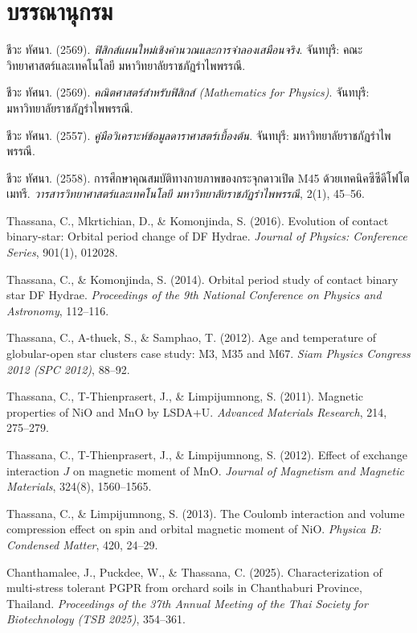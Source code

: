 \chapter*{บรรณานุกรม}
\label{chap:references}

\begin{enumerate}[label={[\arabic*]}, leftmargin=2.5em, itemsep=7pt]
    \item ชีวะ ทัศนา. (2569). \textit{ฟิสิกส์แผนใหม่เชิงคำนวณและการจำลองเสมือนจริง}. จันทบุรี: คณะวิทยาศาสตร์และเทคโนโลยี มหาวิทยาลัยราชภัฏรำไพพรรณี.
    \item ชีวะ ทัศนา. (2569). \textit{คณิตศาสตร์สำหรับฟิสิกส์ (Mathematics for Physics)}. จันทบุรี: มหาวิทยาลัยราชภัฏรำไพพรรณี.
    \item ชีวะ ทัศนา. (2557). \textit{คู่มือวิเคราะห์ข้อมูลดาราศาสตร์เบื้องต้น}. จันทบุรี: มหาวิทยาลัยราชภัฏรำไพพรรณี.
    \item ชีวะ ทัศนา. (2558). การศึกษาคุณสมบัติทางกายภาพของกระจุกดาวเปิด M45 ด้วยเทคนิคซีซีดีโฟโตเมทรี. \textit{วารสารวิทยาศาสตร์และเทคโนโลยี มหาวิทยาลัยราชภัฏรำไพพรรณี}, 2(1), 45--56.
    \item Thassana, C., Mkrtichian, D., \& Komonjinda, S. (2016). Evolution of contact binary-star: Orbital period change of DF Hydrae. \textit{Journal of Physics: Conference Series}, 901(1), 012028.
    \item Thassana, C., \& Komonjinda, S. (2014). Orbital period study of contact binary star DF Hydrae. \textit{Proceedings of the 9th National Conference on Physics and Astronomy}, 112--116.
    \item Thassana, C., A-thuek, S., \& Samphao, T. (2012). Age and temperature of globular-open star clusters case study: M3, M35 and M67. \textit{Siam Physics Congress 2012 (SPC 2012)}, 88--92.
    \item Thassana, C., T-Thienprasert, J., \& Limpijumnong, S. (2011). Magnetic properties of NiO and MnO by LSDA+U. \textit{Advanced Materials Research}, 214, 275--279.
    \item Thassana, C., T-Thienprasert, J., \& Limpijumnong, S. (2012). Effect of exchange interaction $J$ on magnetic moment of MnO. \textit{Journal of Magnetism and Magnetic Materials}, 324(8), 1560--1565.
    \item Thassana, C., \& Limpijumnong, S. (2013). The Coulomb interaction and volume compression effect on spin and orbital magnetic moment of NiO. \textit{Physica B: Condensed Matter}, 420, 24--29.
    \item Chanthamalee, J., Puckdee, W., \& Thassana, C. (2025). Characterization of multi-stress tolerant PGPR from orchard soils in Chanthaburi Province, Thailand. \textit{Proceedings of the 37th Annual Meeting of the Thai Society for Biotechnology (TSB 2025)}, 354--361.

\end{enumerate}
